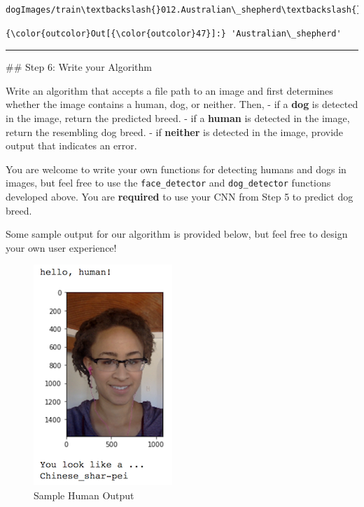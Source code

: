 \documentclass[11pt]{article}
\makeatletter
\def\maxwidth{\ifdim\Gin@nat@width>\linewidth\linewidth
    \else\Gin@nat@width\fi}
\let\Oldincludegraphics\includegraphics
\renewcommand{\includegraphics}[1]{\Oldincludegraphics[width=.8\maxwidth]{#1}}
\makeatother
\begin{document}
    \begin{Verbatim}[commandchars=\\\{\}]
dogImages/train\textbackslash{}012.Australian\_shepherd\textbackslash{}Australian\_shepherd\_00814.jpg

    \end{Verbatim}

\begin{Verbatim}[commandchars=\\\{\}]
{\color{outcolor}Out[{\color{outcolor}47}]:} 'Australian\_shepherd'
\end{Verbatim}
            
    \begin{center}\rule{0.5\linewidth}{\linethickness}\end{center}

 \#\# Step 6: Write your Algorithm

Write an algorithm that accepts a file path to an image and first
determines whether the image contains a human, dog, or neither. Then, -
if a \textbf{dog} is detected in the image, return the predicted breed.
- if a \textbf{human} is detected in the image, return the resembling
dog breed. - if \textbf{neither} is detected in the image, provide
output that indicates an error.

You are welcome to write your own functions for detecting humans and
dogs in images, but feel free to use the \texttt{face\_detector} and
\texttt{dog\_detector} functions developed above. You are
\textbf{required} to use your CNN from Step 5 to predict dog breed.

Some sample output for our algorithm is provided below, but feel free to
design your own user experience!

\begin{figure}
\centering
\includegraphics{images/sample_human_output.png}
\caption{Sample Human Output}
\end{figure}
\end{document}

